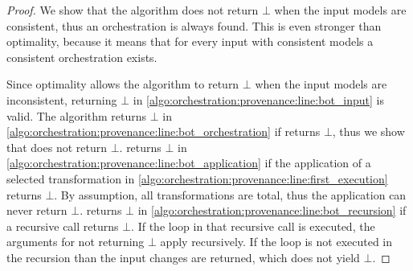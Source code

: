 \begin{proof}
    We show that the algorithm does not return $\bot$ when the input models are consistent, thus an orchestration is always found.
    This is even stronger than optimality, because it means that for every input with consistent models a consistent orchestration exists.

    Since optimality allows the algorithm to return $\bot$ when the input models are inconsistent, returning $\bot$ in \autoref{algo:orchestration:provenance:line:bot_input} is valid.
    The algorithm returns $\bot$ in \autoref{algo:orchestration:provenance:line:bot_orchestration} if  returns $\bot$, thus we show that  does not return $\bot$.
     returns $\bot$ in \autoref{algo:orchestration:provenance:line:bot_application} if the application of a selected transformation in \autoref{algo:orchestration:provenance:line:first_execution} returns $\bot$. By assumption, all transformations are total, thus the application can never return $\bot$.
     returns $\bot$ in \autoref{algo:orchestration:provenance:line:bot_recursion} if a recursive call returns $\bot$. If the loop in that recursive call is executed, the arguments for not returning $\bot$ apply recursively. If the loop is not executed in the recursion than the input changes are returned, which does not yield $\bot$.
    

\end{proof}
